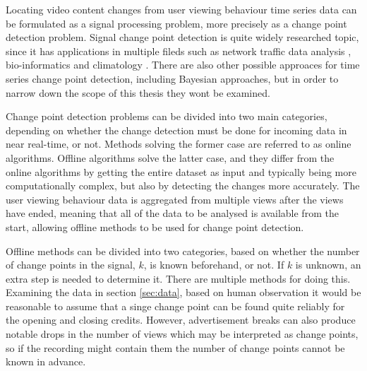 Locating video content changes from user viewing behaviour time series data can be formulated as a signal processing problem, more precisely as a change point detection problem. Signal change point detection is quite widely researched topic, since it has applications in multiple fileds such as network traffic data analysis \cite{levy-leducDetectionLocalizationChangepoints2009} \cite{lung-yut-fongDistributedDetectionLocalization2012}, bio-informatics \cite{liuChangepointDetectionMethod2018} \cite{vertFastDetectionMultiple2010} and climatology \cite{reevesReviewComparisonChangepoint2007} \cite{verbesseltDetectingTrendSeasonal2010a}.
There are also other possible approaces for time series change point detection, including Bayesian approaches, but in order to narrow down the scope of this thesis they wont be examined.

Change point detection problems can be divided into two main categories, depending on whether the change detection must be done for incoming data in near real-time, or not. Methods solving the former case are referred to as online algorithms. Offline algorithms solve the latter case, and they differ from the online algorithms by getting the entire dataset as input and typically being more computationally complex, but also by detecting the changes more accurately. The user viewing behaviour data is aggregated from multiple views after the views have ended, meaning that all of the data to be analysed is available from the start, allowing offline methods to be used for change point detection.

Offline %
methods can be divided into two categories, based on whether the number of change points in the signal, %
$k$, is known beforehand, or not. If $k$ %
is unknown, an extra step is needed to determine it. There are multiple methods for doing this. Examining the data in section \ref{sec:data}, based on human observation it would be reasonable to assume that a singe change point can be found quite reliably for the opening and closing credits. However, advertisement breaks can also produce notable drops in the number of views which may be interpreted as change points, so if the recording might contain them the number of change points cannot be known in advance.

